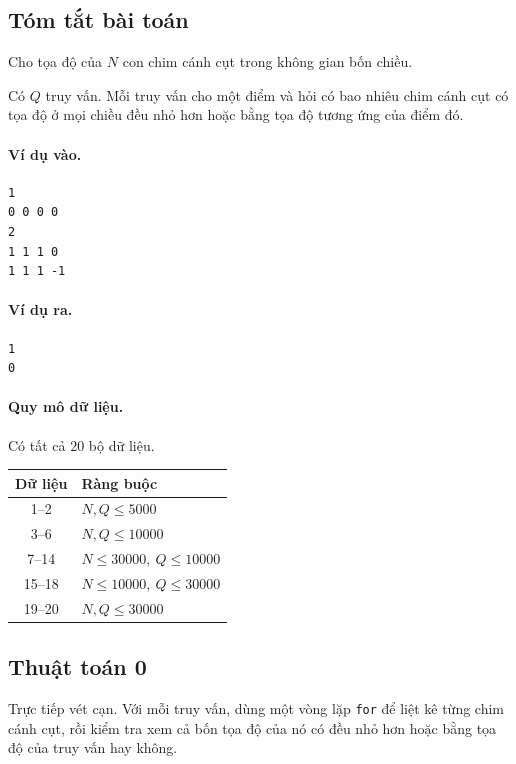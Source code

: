 \documentclass[11pt]{article}
\begin{document}
\subsection{Tóm tắt bài toán}

Cho tọa độ của \(N\) con chim cánh cụt trong không gian bốn chiều.

Có \(Q\) truy vấn. Mỗi truy vấn cho một điểm và hỏi có bao nhiêu chim cánh
cụt có tọa độ ở mọi chiều đều nhỏ hơn hoặc bằng tọa độ tương ứng của điểm
đó.

\paragraph{Ví dụ vào.}
\begin{verbatim}
1
0 0 0 0
2
1 1 1 0
1 1 1 -1
\end{verbatim}

\paragraph{Ví dụ ra.}
\begin{verbatim}
1
0
\end{verbatim}

\paragraph{Quy mô dữ liệu.}
Có tất cả \(20\) bộ dữ liệu.

\begin{center}
\begin{tabular}{c l}
\textbf{Dữ liệu} & \textbf{Ràng buộc} \\
\hline
1--2 & \(N,Q\le 5000\) \\
3--6 & \(N,Q\le 10000\) \\
7--14 & \(N\le 30000,\ Q\le 10000\) \\
15--18 & \(N\le 10000,\ Q\le 30000\) \\
19--20 & \(N,Q\le 30000\)
\end{tabular}
\end{center}

\subsection{Thuật toán 0}

Trực tiếp vét cạn. Với mỗi truy vấn, dùng một vòng lặp \texttt{for} để liệt
kê từng chim cánh cụt, rồi kiểm tra xem cả bốn tọa độ của nó có đều nhỏ hơn
hoặc bằng tọa độ của truy vấn hay không.
\end{document}
